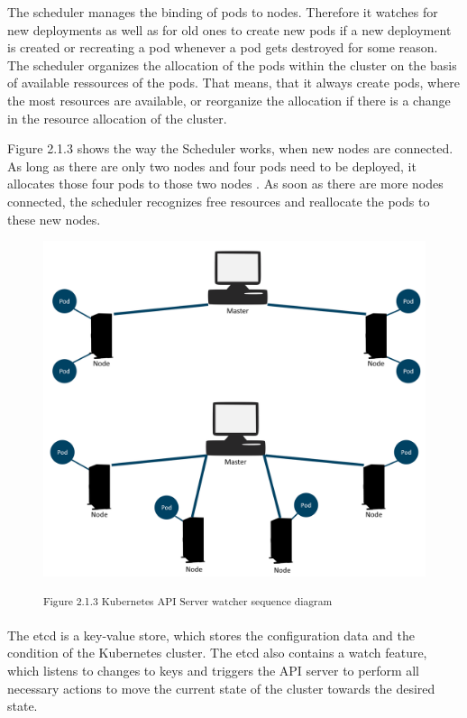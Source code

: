 The scheduler manages the binding of pods to nodes. Therefore it watches for new deployments as well as for old ones to create new pods if a new deployment is created or recreating a pod whenever a pod gets destroyed for some reason. The scheduler organizes the allocation of the pods within the cluster on the basis of available ressources of the pods. That means, that it always create pods, where the most resources are available, or reorganize the allocation if there is a change in the resource allocation of the cluster.%

Figure 2.1.3 shows the way the Scheduler works, when new nodes are connected. As long as there are only two nodes and four pods need to be deployed, it allocates those four pods to those two nodes . As soon as there are more nodes connected, the scheduler recognizes free resources and reallocate the pods to these new nodes.

\begin{figure}[h]
\centering
\includegraphics[width=\textwidth/5*3]{images/kubernetes_scheduler.png}

\textsuperscript{Figure 2.1.3 Kubernetes API Server watcher sequence diagram}
\end{figure}

The etcd is a key-value store, which stores the configuration data and the condition of the Kubernetes cluster. The etcd also contains a watch feature, which listens to changes to keys and triggers the API server to perform all necessary actions to move the current state of the cluster towards the desired state.

